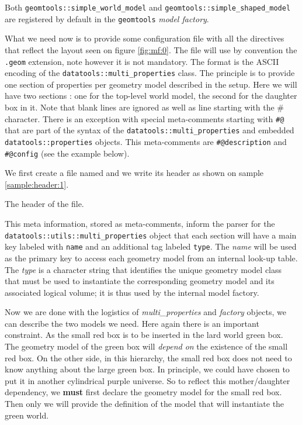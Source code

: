 Both            \texttt{geomtools::simple\_world\_model}           and
\texttt{geomtools::simple\_shaped\_model} are registered by default in
the \texttt{geomtools} \emph{model factory}.

What we  need now is to  provide some configuration file  with all the
directives that reflect the  layout seen on figure \ref{fig:mf:0}. The
file will use by convention the \texttt{.geom} extension, note however
it  is  not  mandatory.  The  format  is  the  ASCII encoding  of  the
\texttt{datatools::multi\_properties}  class. The  principle is
to provide one  section of properties per geometry  model described in
the setup. Here we will have two sections : one for the top-level world
model, the  second for the daughter  box in it. Note  that blank lines
are ignored as  well as line starting with the  \# character. There is
an exception  with special meta-comments starting  with \verb+#@+ that
are        part        of        the       syntax        of        the
\texttt{datatools::multi\_properties}        and       embedded
\texttt{datatools::properties} objects.  This meta-comments are
\verb+#@description+ and \verb+#@config+ (see the example below).

We first  create a file named   and we write
its header as shown on sample \ref{sample:header:1}.

\begin{sample}
\caption{The header of the   file.}
\label{sample:header:1}
\end{sample}


\pn This meta information,  stored as meta-comments, inform the parser
for  the \\  \texttt{datatools::utils::multi\_properties}  object that
each section  will have  a main key  labeled with \verb+name+  and an
additional tag labeled \verb+type+.  The \emph{name} will be used as
the primary key to access  each geometry model from an internal look-up
table.   The \emph{type}  is a  character string  that  identifies the
unique  geometry model  class that  must  be used  to instantiate  the
corresponding geometry model and  its associated logical volume; it is
thus used by the internal model factory.

\pn Now we are done with the logistics of \emph{multi\_properties} and
\emph{factory} objects, we can describe  the two models we need.  Here
again there is an important constraint.  As the small red box is to be
inserted in the lard world green  box. The geometry model of the green
box will \emph{depend on} the existence  of the small red box.  On the
other side, in this hierarchy, the small red box does not need to know
anything about the large green box. In principle, we could have chosen
to put it in another  cylindrical purple universe.  So to reflect this
mother/daughter  dependency,   we  \textbf{must}  first   declare  the
geometry model  for the small red  box. Then only we  will provide the
definition of the model that will instantiate the green world.

